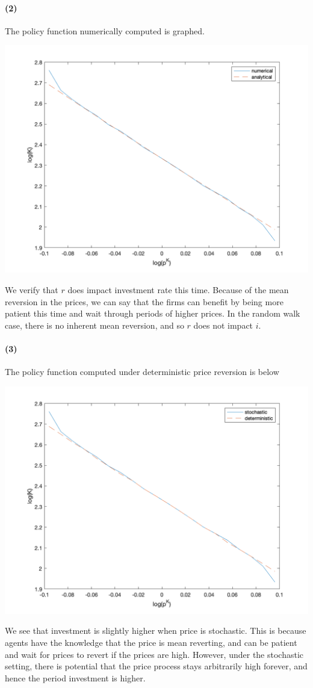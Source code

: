 \documentclass[10pt,letter]{article}
\newcommand{\problempart}[1]{\paragraph{#1}}
\begin{document}
\problempart{(2)}
The policy function numerically computed is graphed.

\includegraphics[width=15cm]{ps1fig1}

We verify that $r$ does impact investment rate this time. Because of the mean reversion in the prices, we can say that the firms can benefit by being more patient this time and wait through periods of higher prices. In the random walk case, there is no inherent mean reversion, and so $r$ does not impact $i$.
\problempart{(3)} The policy function computed under deterministic price reversion is below

\includegraphics[width=15cm]{ps1fig2}

We see that investment is slightly higher when price is stochastic. This is because agents have the knowledge that the price is mean reverting, and can be patient and wait for prices to revert if the prices are high. However, under the stochastic setting, there is potential that the price process stays arbitrarily high forever, and hence the period investment is higher.
\end{document}
